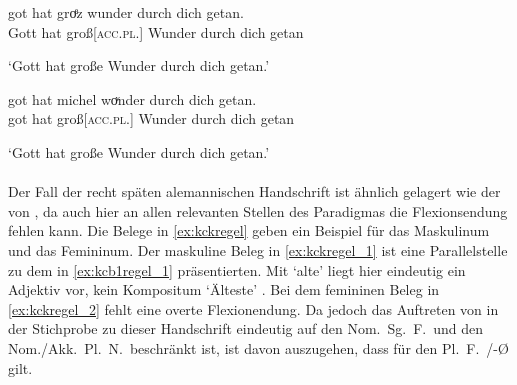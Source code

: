 \begin{exe}
\ex \label{ex:kcc1akkpln0}
	\begin{xlist}
	\ex \label{ex:kcc1akkpln0_1}
		\gll got hat groͤz wunder durch dich getan. \\
			Gott hat groß[\textsc{acc.pl.\NeutI}] Wunder durch dich getan \\
		\begin{taggedline}{\parencites%
			[\pno~72\ra, 38]{kc:C1}[vgl.]%
			[\pno~82\rb, 35]{kc:K}%
			[\pno~279\ra, 17]{kc:Z}%
			[13778]{schroeder1895}%
		}
		\trans `Gott hat große Wunder durch dich getan.'
		\end{taggedline}

	\ex \label{ex:kcc1akkpln0_2}
		\gll got hat michel woͮnder durch dich getan. \\
			 got hat groß[\textsc{acc.pl.\NeutI}] Wunder durch dich getan \\
		\begin{taggedline}{\parencites%
			[\pno~59\va, 14]{kc:A1}[vgl.]%
			[\pno~105\rb, 21]{kc:M}%
			[\pno~83\vb, 28]{kc:H}%
			[\pno~36a\vc, 24]{kc:B1}%
			[\pno~93\vb, 32]{kc:VB}%
			[13778]{schroeder1895}%
		}
		\trans `Gott hat große Wunder durch dich getan.'
		\end{taggedline}
	\end{xlist}
\end{exe}

\paragraph{\citet{kc:K}}
Der Fall der recht späten alemannischen Handschrift \citet{kc:K} ist ähnlich
gelagert wie der von \citet{kc:C1}, da auch hier an allen relevanten Stellen
des Paradigmas die Flexionsendung fehlen kann. Die Belege in \cref{ex:kckregel}
geben ein Beispiel für das Maskulinum und das Femininum. Der maskuline Beleg in
\cref{ex:kckregel_1} ist eine Parallelstelle zu dem in \cref{ex:kcb1regel_1}
präsentierten. Mit  `alte' liegt hier eindeutig ein Adjektiv
vor, kein Kompositum  `Älteste'
\autocite[vgl.][\pno~\textit{althêrre}]{mwb1}. Bei dem femininen Beleg in
\cref{ex:kckregel_2} fehlt eine overte Flexionendung.
Da jedoch das Auftreten von  in der Stichprobe zu dieser Handschrift
eindeutig auf den Nom.\ Sg.\ F.\ und den Nom./Akk.\ Pl.\ N.\ beschränkt ist,
ist davon auszugehen, dass für den Pl.~F.\ /-Ø gilt.

